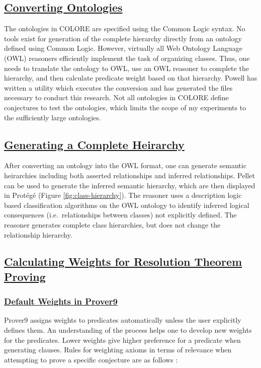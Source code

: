 \documentclass{article}
\begin{document}
\subsection{\underline{Converting Ontologies}}
The ontologies in COLORE are specified using the Common Logic syntax. No tools exist for generation of the complete hierarchy directly from an ontology defined using Common Logic. However, virtually all Web Ontology Language (OWL) reasoners efficiently implement the task of organizing classes. Thus, one needs to translate the ontology to OWL, use an OWL reasoner to complete the hierarchy, and then calculate predicate weight based on that hierarchy. Powell has written a utility which executes the conversion and has generated the files necessary to conduct this research. Not all ontologies in COLORE define conjectures to test the ontologies, which limits the scope of my experiments to the sufficiently large ontologies. 

\subsection{\underline{Generating a Complete Heirarchy}}
After converting an ontology into the OWL format, one can generate semantic heirarchies including both asserted relationships and inferred relationships. Pellet can be used to generate the inferred semantic hierarchy, which are then displayed in 
 Prot{\'e}g{\'e} (Figure \ref{fig:class-hierarchy}). The reasoner uses a description logic based classification algorithms on the OWL ontology to identify inferred logical consequences (i.e.~relationships between classes) not explicitly defined. The reasoner generates complete class hierarchies, but does not change the relationship hierarchy.

\subsection{\underline{Calculating Weights for Resolution Theorem Proving}}
\subsubsection{\underline{Default Weights in Prover9}}
Prover9 assigns weights to predicates automatically unless the user explicitly defines them. An understanding of the process helps one to develop new weights for the predicates. Lower weights give higher preference for a predicate when generating clauses. Rules for weighting axioms in terms of relevance when attempting to prove a specific conjecture are as follows \cite{mccune2005prover9}: 
\end{document}
